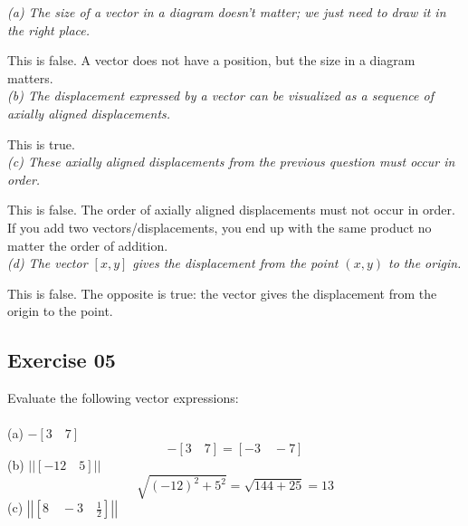 \documentclass[12pt, a4paper]{article}
\begin{document}
\textit
{
	(a) The size of a vector in a diagram doesn't matter; we just need
	to draw it in the right place.\\
}

This is false. A vector does not have a position, but the size in a diagram matters.\\

\textit
{
	(b) The displacement expressed by a vector can be visualized as a
	sequence of axially aligned displacements.\\
}

This is true.\\

\textit
{
	(c) These axially aligned displacements from the previous question
	must occur in order.\\
}

This is false. The order of axially aligned displacements must not occur in order. If you add two vectors/displacements, you end up with the same product no matter the order of addition.\\

\textit
{
	 (d) The vector $[x, y]$ gives the displacement from the point $(x,
	 y)$ to the origin.\\
}

This is false. The opposite is true: the vector gives the displacement from the origin to the point.\\

\newpage\quad

\subsection*{Exercise 05}

Evaluate the following vector expressions:\\\\
(a) \quad $-[3 \quad 7]$\\

\begin{equation}
	\tag*{}
	-[3 \quad 7] = [-3 \quad -7]
\end{equation}
(b) \quad $\left|\left|\left[ -12 \quad 5 \right]\right|\right|$\\


\begin{equation}
	\tag*{}
	\sqrt{\left(-12\right)^2 + 5^2} = \sqrt{144 + 25} = 13
\end{equation}
(c) \quad $\left|\left| \left[ 8 \quad -3 \quad \frac{1}{2} \right]
	\right|\right|$
\end{document}
